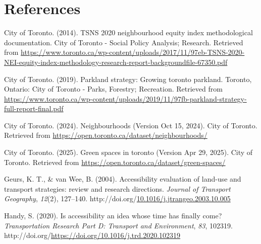 \documentclass[
11pt, %
oneside, %
english, %
singlespacing, %
]{macthesis} %
\newlength{\cslhangindent}
\newenvironment{CSLReferences}[2] %
{\begin{list}{}{%
	\setlength{\itemindent}{0pt}
	\setlength{\leftmargin}{0pt}
	\setlength{\parsep}{0pt}
	\ifodd #1
	\setlength{\leftmargin}{\cslhangindent}
	\setlength{\itemindent}{-1\cslhangindent}
	\fi
	\setlength{\itemsep}{#2\baselineskip}}}
{\end{list}}
\begin{document}
\backmatter

\chapter*{References}\label{references}


\noindent

\setlength{\parindent}{-0.20in}
\setlength{\leftskip}{0.20in}
\setlength{\parskip}{8pt}

\label{refs}
\begin{CSLReferences}{1}{0}
City of Toronto. (2014). TSNS 2020 neighbourhood equity index methodological documentation. City of Toronto - Social Policy Analysis; Research. Retrieved from \url{https://www.toronto.ca/wp-content/uploads/2017/11/97eb-TSNS-2020-NEI-equity-index-methodology-research-report-backgroundfile-67350.pdf}

City of Toronto. (2019). Parkland strategy: Growing toronto parkland. Toronto, Ontario: City of Toronto - Parks, Forestry; Recreation. Retrieved from \url{https://www.toronto.ca/wp-content/uploads/2019/11/97fb-parkland-strategy-full-report-final.pdf}

City of Toronto. (2024). Neighbourhoods (Version Oct 15, 2024). City of Toronto. Retrieved from \url{https://open.toronto.ca/dataset/neighbourhoods/}

City of Toronto. (2025). Green spaces in toronto (Version Apr 29, 2025). City of Toronto. Retrieved from \url{https://open.toronto.ca/dataset/green-spaces/}

Geurs, K. T., \& van Wee, B. (2004). Accessibility evaluation of land-use and transport strategies: review and research directions. \emph{Journal of Transport Geography}, \emph{12}(2), 127--140. http://doi.org/\href{https://doi.org/10.1016/j.jtrangeo.2003.10.005}{10.1016/j.jtrangeo.2003.10.005}

Handy, S. (2020). Is accessibility an idea whose time has finally come? \emph{Transportation Research Part D: Transport and Environment}, \emph{83}, 102319. http://doi.org/\url{https://doi.org/10.1016/j.trd.2020.102319}


\end{CSLReferences}
\end{document}
